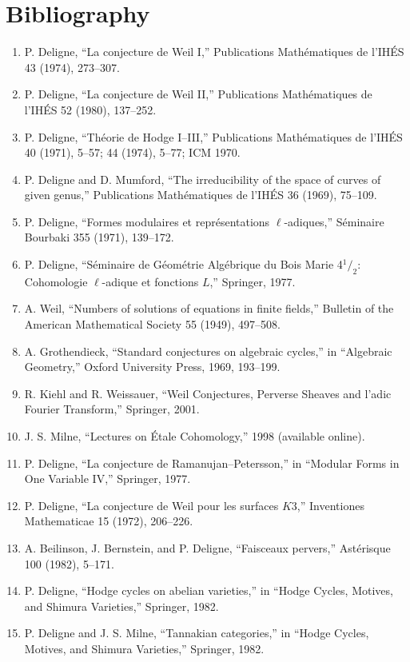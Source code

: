 \section*{Bibliography}
\begin{enumerate}
\item P. Deligne, ``La conjecture de Weil I,'' Publications Math\'ematiques de l'IH\'ES 43 (1974), 273--307.
\item P. Deligne, ``La conjecture de Weil II,'' Publications Math\'ematiques de l'IH\'ES 52 (1980), 137--252.
\item P. Deligne, ``Th\'eorie de Hodge I--III,'' Publications Math\'ematiques de l'IH\'ES 40 (1971), 5--57; 44 (1974), 5--77; ICM 1970.
\item P. Deligne and D. Mumford, ``The irreducibility of the space of curves of given genus,'' Publications Math\'ematiques de l'IH\'ES 36 (1969), 75--109.
\item P. Deligne, ``Formes modulaires et repr\'esentations $\ell$-adiques,'' S\'eminaire Bourbaki 355 (1971), 139--172.
\item P. Deligne, ``S\'eminaire de G\'eom\'etrie Alg\'ebrique du Bois Marie 4$^1/_2$: Cohomologie $\ell$-adique et fonctions $L$,'' Springer, 1977.
\item A. Weil, ``Numbers of solutions of equations in finite fields,'' Bulletin of the American Mathematical Society 55 (1949), 497--508.
\item A. Grothendieck, ``Standard conjectures on algebraic cycles,'' in ``Algebraic Geometry,'' Oxford University Press, 1969, 193--199.
\item R. Kiehl and R. Weissauer, ``Weil Conjectures, Perverse Sheaves and l'adic Fourier Transform,'' Springer, 2001.
\item J. S. Milne, ``Lectures on \'Etale Cohomology,'' 1998 (available online).
\item P. Deligne, ``La conjecture de Ramanujan--Petersson,'' in ``Modular Forms in One Variable IV,'' Springer, 1977.
\item P. Deligne, ``La conjecture de Weil pour les surfaces $K3$,'' Inventiones Mathematicae 15 (1972), 206--226.
\item A. Beilinson, J. Bernstein, and P. Deligne, ``Faisceaux pervers,'' Ast\'erisque 100 (1982), 5--171.
\item P. Deligne, ``Hodge cycles on abelian varieties,'' in ``Hodge Cycles, Motives, and Shimura Varieties,'' Springer, 1982.
\item P. Deligne and J. S. Milne, ``Tannakian categories,'' in ``Hodge Cycles, Motives, and Shimura Varieties,'' Springer, 1982.

\end{enumerate}
